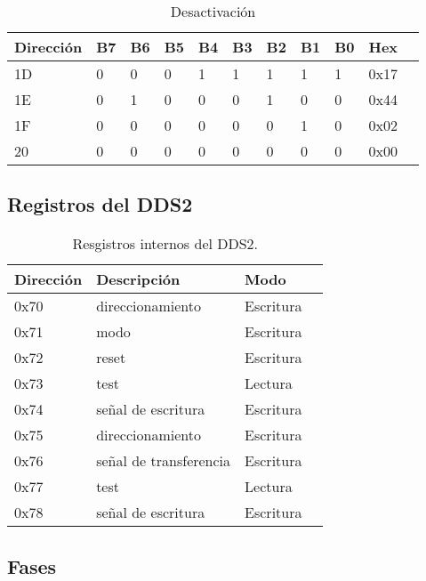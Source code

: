     \begin{table}[ht]
    \centering
    \begin{tabular}{|l|l|l|l|l|l|l|l|l|l|l|}
    \hline
    Direcci\'on  &B7 & B6 & B5 & B4& B3 & B2& B1 & B0 &Hex\\
    \hline
    1D  &0 & 0 & 0 & 1& 1 & 1& 1 & 1 &0x17\\
    \hline
    1E  &0 & 1 & 0 & 0& 0 & 1& 0 & 0 &0x44\\
    \hline
    1F  &0 & 0 & 0 & 0& 0 & 0& 1 & 0 & 0x02\\
    \hline
    20  &0 & 0 & 0 & 0 & 0 & 0& 0 & 0&0x00 \\
    \hline
    \end{tabular}
    \caption{\label{tab:dds2_deactivate}Desactivaci\'on}
    \end{table}
\newpage
\subsection{Registros del DDS2}
\begin{table}[ht]
    \centering
    \begin{tabular}{|l|l|l|l|}
    \hline
    Direcci\'on  & Descripci\'on             & Modo      \\
    \hline
    0x70       & direccionamiento        & Escritura \\
    \hline
    0x71       & modo                    & Escritura \\
    \hline
    0x72       & reset                   & Escritura \\
    \hline
    0x73       & test                    & Lectura   \\
    \hline
    0x74       & se\~nal de escritura      & Escritura \\
    \hline
    0x75       & direccionamiento        & Escritura \\
    \hline
    0x76       & se\~nal de transferencia  & Escritura \\
    \hline
    0x77       & test                    & Lectura   \\
    \hline
    0x78       & se\~nal de escritura      & Escritura \\
    \hline
\end{tabular}
\caption{\label{tab:registros_internos_dds2}Resgistros internos del DDS2.}
\end{table}


\subsection{Fases}

